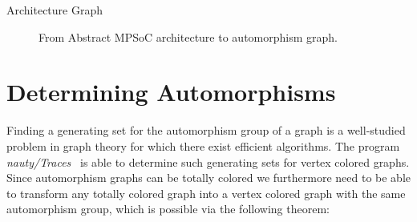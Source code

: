 \begin{exmp}[label=exmp:arch_graph]{Architecture Graph}
\begin{figure}[H]
\begin{subfigure}{.3\textwidth}
      \caption{}
      \label{fig:tcol_simple_arch_graph}
    \end{subfigure}
    \caption{From Abstract MPSoC architecture to automorphism graph.}
  \end{figure}
\end{exmp}

\section{Determining Automorphisms}
\label{sec:ag_determining_automorphisms}

Finding a generating set for the automorphism group of a graph is a
well-studied problem in graph theory for which there exist efficient
algorithms. The program \textit{nauty/Traces}~\cite{nauty} is able to determine
such generating sets for vertex colored graphs. Since automorphism graphs can
be totally colored we furthermore need to be able to transform any
totally colored graph into a vertex colored graph with the same automorphism
group, which is possible via the following theorem:


